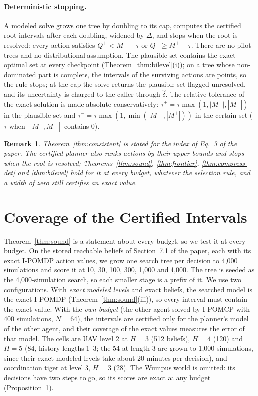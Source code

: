 \documentclass{article}
\newtheorem{remark}{Remark}
\begin{document}
\paragraph{Deterministic stopping.} A modeled solve grows one tree by doubling to its cap, computes the certified root intervals after each doubling, widened by $\Delta$, and stops when the root is resolved: every action satisfies $Q^+ < M^- - \tau$ or $Q^- \geq M^+ - \tau$. There are no pilot trees and no distributional assumption. The plausible set contains the exact optimal set at every checkpoint (Theorem~\ref{thm:bilevel}(i)); on a tree whose non-dominated part is complete, the intervals of the surviving actions are points, so the rule stops; at the cap the solve returns the plausible set flagged unresolved, and its uncertainty is charged to the caller through $\hat\delta$. The relative tolerance of the exact solution is made absolute conservatively: $\tau^+ = \tau \max(1, |M^-|, |M^+|)$ in the plausible set and $\tau^- = \tau \max(1, \min(|M^-|, |M^+|))$ in the certain set ($\tau$ when $[M^-, M^+]$ contains 0).

\begin{remark}
Theorem~\ref{thm:consistent} is stated for the index of Eq.~3 of the paper. The certified planner also ranks actions by their upper bounds and stops when the root is resolved; Theorems~\ref{thm:sound}, \ref{thm:frontier}, \ref{thm:compress-det} and \ref{thm:bilevel} hold for it at every budget, whatever the selection rule, and a width of zero still certifies an exact value.
\end{remark}

\section{Coverage of the Certified Intervals}
\label{sec:coverage}

Theorem~\ref{thm:sound} is a statement about every budget, so we test it at every budget. On the stored reachable beliefs of Section~7.1 of the paper, each with its exact I-POMDP action values, we grow one search tree per decision to 4{,}000 simulations and score it at 10, 30, 100, 300, 1{,}000 and 4{,}000. The tree is seeded as the 4{,}000-simulation search, so each smaller stage is a prefix of it. We use two configurations. With \emph{exact modeled levels} and exact beliefs, the searched model is the exact I-POMDP (Theorem~\ref{thm:sound}(iii)), so every interval must contain the exact value. With the \emph{own budget} (the other agent solved by I-POMCP with 400 simulations, $N = 64$), the intervals are certified only for the planner's model of the other agent, and their coverage of the exact values measures the error of that model. The cells are UAV level 2 at $H = 3$ (512 beliefs), $H = 4$ (120) and $H = 5$ (84, history lengths 1--3; the 54 at length 3 are grown to 1{,}000 simulations, since their exact modeled levels take about 20 minutes per decision), and coordination tiger at level 3, $H = 3$ (28). The Wumpus world is omitted: its decisions have two steps to go, so its scores are exact at any budget (Proposition~1).
\end{document}

